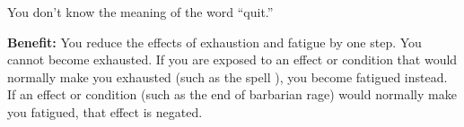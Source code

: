 
You don’t know the meaning of the word “quit.”

\textbf{Benefit:} You reduce the effects of exhaustion and fatigue by one step. You cannot become exhausted. If you are exposed to an effect or condition that would normally make you exhausted (such as the spell ), you become fatigued instead. If an effect or condition (such as the end of barbarian rage) would normally make you fatigued, that effect is negated.